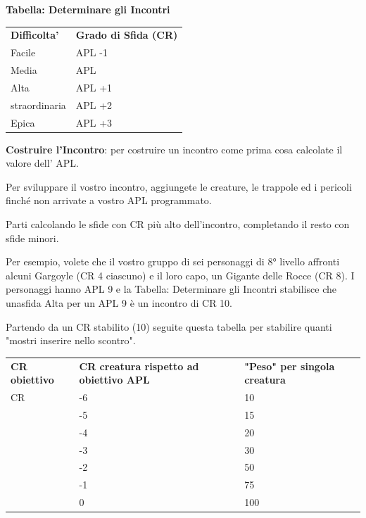 \documentclass[a4paper,11pt,twoside,openany]{book}
\begin{document}
\textbf{Tabella: Determinare gli Incontri}

\begin{tabular}{ll}
	\toprule
	\textbf{Difficolta'} & \textbf{Grado di Sfida (CR)}\\
	Facile               & APL -1\\
	Media& APL\\
	Alta & APL +1\\
	straordinaria        & APL +2\\
	Epica& APL +3\\
\end{tabular}

\bigskip

\textbf{Costruire l'Incontro}: per costruire un incontro come prima cosa calcolate il valore dell' APL.

Per sviluppare il vostro incontro, aggiungete le creature, le trappole ed i pericoli finché non arrivate a vostro APL programmato.

Parti calcolando le sfide con CR più alto dell'incontro, completando il resto con sfide minori.

Per esempio, volete che il vostro gruppo di sei personaggi di 8° livello affronti alcuni Gargoyle (CR 4 ciascuno) e il loro capo, un Gigante delle Rocce (CR 8). I personaggi hanno APL 9 e la Tabella: Determinare gli Incontri stabilisce che unasfida Alta per un APL 9 è un incontro di CR 10.

Partendo da un CR stabilito (10) seguite questa tabella per stabilire quanti "mostri inserire nello scontro".

\bigskip

\begin{tabular}{lll}
	\toprule
	\textbf{CR obiettivo} & \textbf{CR creatura rispetto ad obiettivo APL} & \textbf{"Peso" per singola creatura}\\
	CR                    & -6                                             & 10\\
	                      & -5                                             & 15\\
	                      & -4                                             & 20\\
	                      & -3                                             & 30\\
	                      & -2                                             & 50\\
	                      & -1                                             & 75\\
	                      & 0                                              & 100\\
\end{tabular}
\end{document}
